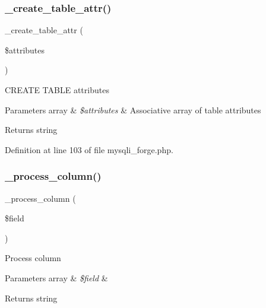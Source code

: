 \mbox{\label{class_c_i___d_b__mysqli__forge_a10b25326d82f6ddd9af1935e52e42b72}} 
\subsubsection{\texorpdfstring{\_create\_table\_attr()}{\_create\_table\_attr()}}
{\footnotesize\ttfamily \+\_\+create\+\_\+table\+\_\+attr (\begin{DoxyParamCaption}\item[{}]{\$attributes }\end{DoxyParamCaption})\hspace{0.3cm}{\ttfamily [protected]}}

C\+R\+E\+A\+TE T\+A\+B\+LE attributes


\begin{DoxyParams}[1]{Parameters}
array & {\em \$attributes} & Associative array of table attributes \\
\hline
\end{DoxyParams}
\begin{DoxyReturn}{Returns}
string 
\end{DoxyReturn}


Definition at line 103 of file mysqli\+\_\+forge.\+php.

\mbox{\label{class_c_i___d_b__mysqli__forge_a8f38f1c5b5dddecca4befbe393f3f299}} 
\subsubsection{\texorpdfstring{\_process\_column()}{\_process\_column()}}
{\footnotesize\ttfamily \+\_\+process\+\_\+column (\begin{DoxyParamCaption}\item[{}]{\$field }\end{DoxyParamCaption})\hspace{0.3cm}{\ttfamily [protected]}}

Process column


\begin{DoxyParams}[1]{Parameters}
array & {\em \$field} & \\
\hline
\end{DoxyParams}
\begin{DoxyReturn}{Returns}
string 
\end{DoxyReturn}


